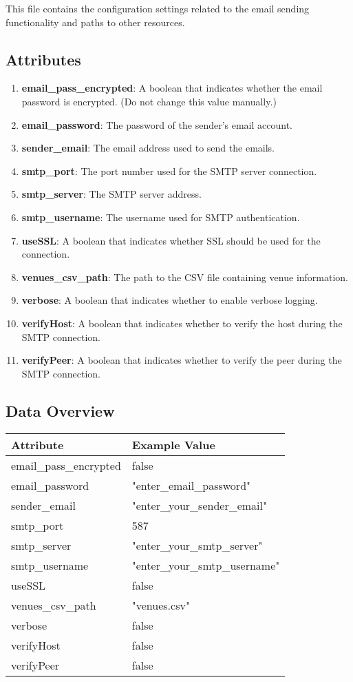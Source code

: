\documentclass{article}
\begin{document}
	This file contains the configuration settings related to the email sending functionality and paths to other resources.
	
	\subsection*{Attributes}
	\begin{enumerate}
		\item \textbf{email\_pass\_encrypted}: A boolean that indicates whether the email password is encrypted. (Do not change this value manually.)
		\item \textbf{email\_password}: The password of the sender's email account.
		\item \textbf{sender\_email}: The email address used to send the emails.
		\item \textbf{smtp\_port}: The port number used for the SMTP server connection.
		\item \textbf{smtp\_server}: The SMTP server address.
		\item \textbf{smtp\_username}: The username used for SMTP authentication.
		\item \textbf{useSSL}: A boolean that indicates whether SSL should be used for the connection.
		\item \textbf{venues\_csv\_path}: The path to the CSV file containing venue information.
		\item \textbf{verbose}: A boolean that indicates whether to enable verbose logging.
		\item \textbf{verifyHost}: A boolean that indicates whether to verify the host during the SMTP connection.
		\item \textbf{verifyPeer}: A boolean that indicates whether to verify the peer during the SMTP connection.
	\end{enumerate}
	
	\subsection*{Data Overview}
	
	\begin{tabular}{|l|l|}
		\hline
		\textbf{Attribute} & \textbf{Example Value} \\
		\hline
		email\_pass\_encrypted & false \\
		\hline
		email\_password & "enter\_email\_password" \\
		\hline
		sender\_email & "enter\_your\_sender\_email" \\
		\hline
		smtp\_port & 587 \\
		\hline
		smtp\_server & "enter\_your\_smtp\_server" \\
		\hline
		smtp\_username & "enter\_your\_smtp\_username" \\
		\hline
		useSSL & false \\
		\hline
		venues\_csv\_path & "venues.csv" \\
		\hline
		verbose & false \\
		\hline
		verifyHost & false \\
		\hline
		verifyPeer & false \\
		\hline
	\end{tabular}
	
\end{document}
